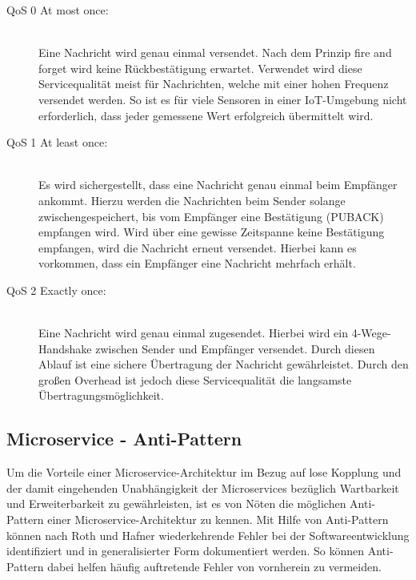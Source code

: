 \begin{description}
    \item[QoS 0 \glqq At most once\grqq{}:]\hfill \\
    Eine Nachricht wird genau einmal versendet. Nach dem Prinzip \glqq fire and forget\grqq{} wird keine Rückbestätigung erwartet. Verwendet wird diese Servicequalität meist für Nachrichten, welche mit einer hohen Frequenz versendet werden. So ist es für viele Sensoren in einer IoT-Umgebung nicht erforderlich, dass jeder gemessene Wert erfolgreich übermittelt wird.
    
    \item[QoS 1 \glqq At least once\grqq{}:]\hfill \\
    Es wird sichergestellt, dass eine Nachricht genau einmal beim Empfänger ankommt. Hierzu werden die Nachrichten beim Sender solange zwischengespeichert, bis vom Empfänger eine Bestätigung (PUBACK) empfangen wird. Wird über eine gewisse Zeitspanne keine Bestätigung empfangen, wird die Nachricht erneut versendet. Hierbei kann es vorkommen, dass ein Empfänger eine Nachricht mehrfach erhält. \cite{FlorianRaschbichler.2017}
    
    \item[QoS 2 \glqq Exactly once\grqq{}:]\hfill \\
    Eine Nachricht wird genau einmal zugesendet. Hierbei wird ein 4-Wege-Handshake zwischen Sender und Empfänger versendet. Durch diesen Ablauf ist eine sichere Übertragung der Nachricht gewährleistet. Durch den großen Overhead ist jedoch diese Servicequalität die langsamste Übertragungsmöglichkeit.

\end{description}

\subsection{Microservice - Anti-Pattern\label{subsec2.2.2:Unterunterpunkt-2}}

Um die Vorteile einer Microservice-Architektur im Bezug auf lose Kopplung und der damit eingehenden Unabhängigkeit der Microservices bezüglich Wartbarkeit und Erweiterbarkeit zu gewährleisten, ist es von Nöten die möglichen Anti-Pattern einer Microservice-Architektur zu kennen. Mit Hilfe von Anti-Pattern können nach Roth und Hafner \cite{StephanRoth.2019} wiederkehrende Fehler bei der Softwareentwicklung identifiziert und in generalisierter Form dokumentiert werden. So können Anti-Pattern dabei helfen häufig auftretende Fehler von vornherein zu vermeiden.

